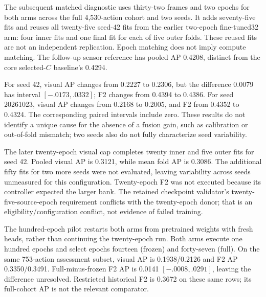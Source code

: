 The subsequent matched diagnostic uses thirty-two frames and two epochs for both arms
across the full 4,530-action cohort and two seeds. It adds seventy-five fits and reuses
all twenty-five seed-42 fits from the earlier two-epoch fine-tuned32 arm: four inner
fits and one final fit for each of five outer folds. These reused fits are not an
independent replication. Epoch matching does not imply compute matching. The follow-up
sensor reference has pooled AP 0.4208, distinct from the core selected-$C$ baseline's
0.4294.

For seed 42, visual AP changes from 0.2227 to 0.2306, but the difference 0.0079 has
interval $[-.0173,.0332]$; F2 changes from 0.4394 to 0.4386. For seed 20261023, visual
AP changes from 0.2168 to 0.2005, and F2 from 0.4352 to 0.4324. The corresponding paired
intervals include zero. These results do not identify a unique cause for the absence of
a fusion gain, such as calibration or out-of-fold mismatch; two seeds also do not fully
characterize seed variability.

The later twenty-epoch visual cap completes twenty inner and five outer fits for seed
42. Pooled visual AP is 0.3121, while mean fold AP is 0.3086. The additional fifty fits
for two more seeds were not evaluated, leaving variability across seeds unmeasured
for this configuration. Twenty-epoch F2 was not executed because its controller expected the
larger bank. The retained checkpoint validator's twenty-five-source-epoch requirement
conflicts with the twenty-epoch donor; that is an eligibility/configuration conflict,
not evidence of failed training.

The hundred-epoch pilot restarts both arms from pretrained weights with fresh heads,
rather than continuing the twenty-epoch run. Both arms execute one hundred epochs and
select epochs fourteen (frozen) and forty-seven (full). On the same 753-action
assessment subset, visual AP is 0.1938/0.2126 and F2 AP 0.3350/0.3491. Full-minus-frozen
F2 AP is 0.0141 $[-.0008,.0291]$, leaving the difference unresolved. Restricted
historical F2 is 0.3672 on these same rows; its full-cohort AP is not the relevant
comparator.

